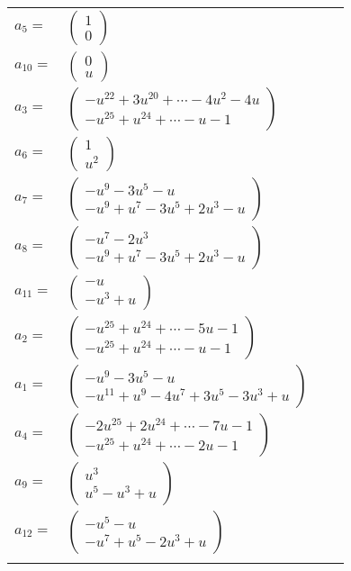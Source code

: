 \documentclass[1p]{elsarticle_modified}
\theoremstyle{definition}
\begin{document}
\begin{tabular}{m{7pt} m{180pt} m{7pt} m{180pt} }
\flushright $a_{5}=$&$\begin{pmatrix}1\\0\end{pmatrix}$ \\
\flushright $a_{10}=$&$\begin{pmatrix}0\\u\end{pmatrix}$ \\
\flushright $a_{3}=$&$\begin{pmatrix}- u^{22}+3 u^{20}+\cdots-4 u^2-4 u\\- u^{25}+u^{24}+\cdots- u-1\end{pmatrix}$ \\
\flushright $a_{6}=$&$\begin{pmatrix}1\\u^2\end{pmatrix}$ \\
\flushright $a_{7}=$&$\begin{pmatrix}- u^9-3 u^5- u\\- u^9+u^7-3 u^5+2 u^3- u\end{pmatrix}$ \\
\flushright $a_{8}=$&$\begin{pmatrix}- u^7-2 u^3\\- u^9+u^7-3 u^5+2 u^3- u\end{pmatrix}$ \\
\flushright $a_{11}=$&$\begin{pmatrix}- u\\- u^3+u\end{pmatrix}$ \\
\flushright $a_{2}=$&$\begin{pmatrix}- u^{25}+u^{24}+\cdots-5 u-1\\- u^{25}+u^{24}+\cdots- u-1\end{pmatrix}$ \\
\flushright $a_{1}=$&$\begin{pmatrix}- u^9-3 u^5- u\\- u^{11}+u^9-4 u^7+3 u^5-3 u^3+u\end{pmatrix}$ \\
\flushright $a_{4}=$&$\begin{pmatrix}-2 u^{25}+2 u^{24}+\cdots-7 u-1\\- u^{25}+u^{24}+\cdots-2 u-1\end{pmatrix}$ \\
\flushright $a_{9}=$&$\begin{pmatrix}u^3\\u^5- u^3+u\end{pmatrix}$ \\
\flushright $a_{12}=$&$\begin{pmatrix}- u^5- u\\- u^7+u^5-2 u^3+u\end{pmatrix}$\\&\end{tabular}
\end{document}
